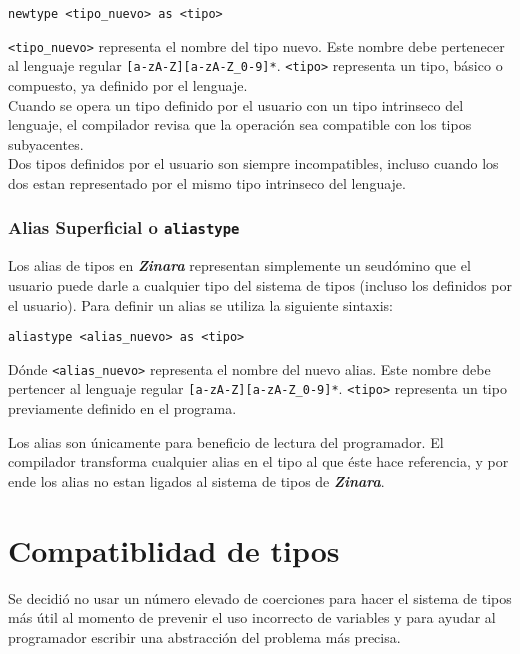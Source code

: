 \documentclass[12pt, spanish]{report}
\begin{document}
\begin{verbatim}
newtype <tipo_nuevo> as <tipo>
\end{verbatim}

\texttt{\textless tipo\_nuevo\textgreater} representa el nombre del
tipo nuevo. Este nombre debe pertenecer al lenguaje regular
\texttt{[a-zA-Z][a-zA-Z\_0-9]*}. \texttt{\textless tipo\textgreater}
representa un tipo, b\'asico o compuesto, ya definido por el lenguaje.\\

Cuando se opera un tipo definido por el usuario con un tipo intrinseco
del lenguaje, el compilador revisa que la operaci\'on sea compatible
con los tipos subyacentes.\\
Dos tipos definidos por el usuario son siempre incompatibles, incluso
cuando los dos estan representado por el mismo tipo intrinseco del
lenguaje.\\

\subsection{Alias Superficial o \texttt{aliastype}}
Los alias de tipos en \emph{\textbf{Zinara}} representan simplemente
un seudómino que el usuario puede darle a cualquier tipo del sistema
de tipos (incluso los definidos por el usuario). Para definir un alias
se utiliza la siguiente sintaxis:

\begin{verbatim}
aliastype <alias_nuevo> as <tipo>
\end{verbatim}

Dónde \texttt{\textless alias\_nuevo\textgreater} representa el nombre
del nuevo alias. Este nombre debe pertencer al lenguaje regular
\texttt{[a-zA-Z][a-zA-Z\_0-9]*}. \texttt{\textless tipo\textgreater}
representa un tipo previamente definido en el programa.

Los alias son únicamente para beneficio de lectura del programador. El
compilador transforma cualquier alias en el tipo al que éste hace
referencia, y por ende los alias no estan ligados al sistema de tipos
de \emph{\textbf{Zinara}}.\\

\chapter{Compatiblidad de tipos}
\label{subsec:comp-tipos}
Se decidi\'o no usar un n\'umero elevado de coerciones para hacer el
sistema de tipos m\'as \'util al momento de prevenir el uso incorrecto
de variables y para ayudar al programador escribir una abstracci\'on del
problema m\'as precisa.\\
\end{document}
